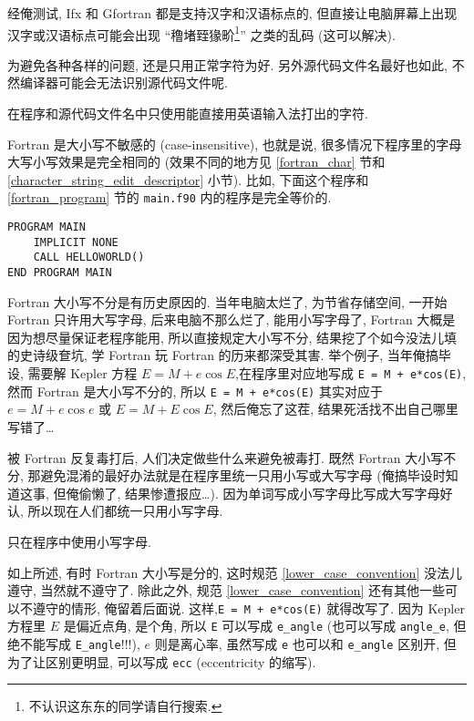 经俺测试, Ifx 和 Gfortran 都是支持汉字和汉语标点的, 但直接让电脑屏幕上出现汉字或汉语标点可能会出现 ``穞堵臸猭畍\footnote{不认识这东东的同学请自行搜索.}'' 之类的乱码 (这可以解决).

为避免各种各样的问题, 还是只用正常字符为好. 另外源代码文件名最好也如此, 不然编译器可能会无法识别源代码文件呢.
\begin{convention}
    在程序和源代码文件名中只使用能直接用英语输入法打出的字符.\label{english_character_convention}
\end{convention}

Fortran 是大小写不敏感的 (case-insensitive), 也就是说, 很多情况下程序里的字母大写小写效果是完全相同的 (效果不同的地方见 \ref{fortran_char} 节和 \ref{character_string_edit_descriptor} 小节). 比如, 下面这个程序和 \ref{fortran_program} 节的 \texttt{main.f90} 内的程序是完全等价的.
\begin{lstlisting}
PROGRAM MAIN
    IMPLICIT NONE
    CALL HELLOWORLD()
END PROGRAM MAIN
\end{lstlisting}

Fortran 大小写不分是有历史原因的. 当年电脑太烂了, 为节省存储空间, 一开始 Fortran 只许用大写字母, 后来电脑不那么烂了, 能用小写字母了, Fortran 大概是因为想尽量保证老程序能用, 所以直接规定大小写不分, 结果挖了个如今没法儿填的史诗级奆坑, 学 Fortran 玩 Fortran 的历来都深受其害. 举个例子, 当年俺搞毕设, 需要解 Kepler 方程 $E=M+e\cos E$,在程序里对应地写成 \texttt{E = M + e*cos(E)}, 然而 Fortran 是大小写不分的, 所以 \texttt{E = M + e*cos(E)} 其实对应于 $e=M+e\cos e$ 或 $E=M+E\cos E$, 然后俺忘了这茬, 结果死活找不出自己哪里写错了\dots{}

被 Fortran 反复毒打后, 人们决定做些什么来避免被毒打. 既然 Fortran 大小写不分, 那避免混淆的最好办法就是在程序里统一只用小写或大写字母 (俺搞毕设时知道这事, 但俺偷懒了, 结果惨遭报应\dots{}). 因为单词写成小写字母比写成大写字母好认, 所以现在人们都统一只用小写字母.
\begin{convention}
    只在程序中使用小写字母.\label{lower_case_convention}
\end{convention}
如上所述, 有时 Fortran 大小写是分的, 这时规范 \ref{lower_case_convention} 没法儿遵守, 当然就不遵守了. 除此之外, 规范 \ref{lower_case_convention} 还有其他一些可以不遵守的情形, 俺留着后面说. 这样,\texttt{E = M + e*cos(E)} 就得改写了. 因为 Kepler 方程里 $E$ 是偏近点角, 是个角, 所以 \texttt{E} 可以写成 \texttt{e\_{}angle} (也可以写成 \texttt{angle\_{}e}, 但绝不能写成 \texttt{E\_{}angle}!!!), $e$ 则是离心率, 虽然写成 \texttt{e} 也可以和 \texttt{e\_{}angle} 区别开, 但为了让区别更明显, 可以写成 \texttt{ecc} (eccentricity 的缩写).

